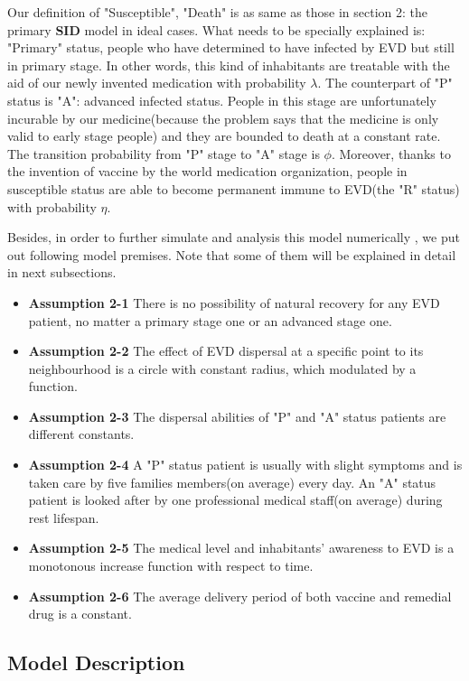 Our definition of "Susceptible", "Death" is as same as those in section 2: the primary \textbf{SID} model in ideal cases. What needs to be specially explained is: "Primary" status, people who have determined to have infected by EVD but still in primary stage. In other words, this kind of  inhabitants are treatable with the aid of our newly invented medication with probability $\lambda$. The counterpart of "P" status is "A": advanced infected status. People in this stage are unfortunately incurable by our medicine(because the problem says that the medicine is only valid to early stage people) and they are bounded to death at a constant rate. The transition probability from "P" stage to "A" stage is $\phi$. Moreover, thanks to the invention of vaccine by the world medication organization, people in susceptible status are able to become permanent immune to EVD(the "R" status) with probability $\eta$. 

Besides, in order to further simulate and analysis this model numerically , we put out following model premises. Note that some of them will be explained in detail in next subsections.

\begin{itemize}
\item \textbf{Assumption 2-1} There is no possibility of natural recovery for any EVD patient, no matter a primary stage one or an advanced stage one.
\item \textbf{Assumption 2-2} The effect of EVD dispersal at a specific point to its neighbourhood is a circle with constant radius, which modulated by a function. 
\item \textbf{Assumption 2-3} The dispersal abilities of "P" and "A" status patients are different constants.
\item \textbf{Assumption 2-4} A "P" status patient is usually with slight symptoms and is taken care by five families members(on average) every day. An "A" status patient is looked after by one professional medical staff(on average) during rest lifespan.
\item \textbf{Assumption 2-5} The medical level and  inhabitants' awareness to EVD is a monotonous increase function with respect to time.\cite{worldebola}
\item \textbf{Assumption 2-6} The average delivery period of both vaccine and remedial drug is a constant.
\end{itemize} 

\subsection{Model Description}
